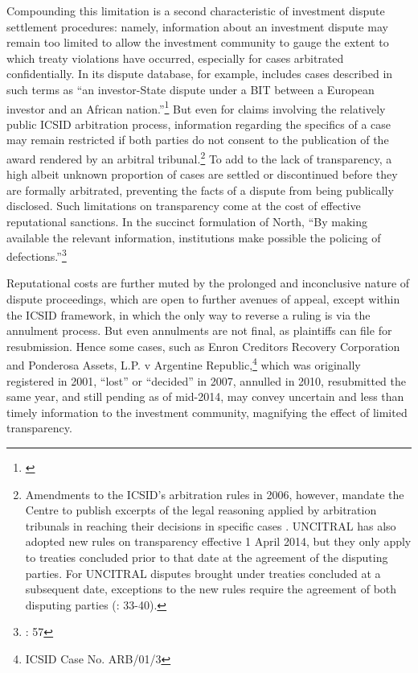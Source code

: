 \documentclass[12pt,onesided]{amsart}
\begin{document}
Compounding this limitation is a second characteristic of investment dispute settlement procedures: namely, information about an investment dispute may remain too limited to allow the investment community to gauge the extent to which treaty violations have occurred, especially for cases arbitrated confidentially. In its dispute database, for example, \citeauthor{unctad:2010} includes cases described in such terms as ``an investor-State dispute under a BIT between a European investor and an African nation.''\footnote{\citet{unctad:2010}} But even for claims involving the relatively public ICSID arbitration process, information regarding the specifics of a case may remain restricted if both parties do not consent to the publication of the award rendered by an arbitral tribunal.\footnote{Amendments to the ICSID's arbitration rules in 2006, however, mandate the Centre to publish excerpts of the legal reasoning applied by arbitration tribunals in reaching their decisions in specific cases \citep{antonietti:2006}. UNCITRAL has also adopted new rules on transparency effective 1 April 2014, but they only apply to treaties concluded prior to that date at the agreement of the disputing parties. For UNCITRAL disputes brought under treaties concluded at a subsequent date, exceptions to the new rules require the agreement of both disputing parties (\citealp{uncitral:2013}: 33-40).}  To add to the lack of transparency, a high albeit unknown proportion of cases are settled or discontinued before they are formally arbitrated, preventing the facts of a dispute from being publically disclosed. Such limitations on transparency come at the cost of effective reputational sanctions. In the succinct formulation of North, ``By making available the relevant information, institutions make possible the policing of defections.''\footnote{\citet{north1990institutions}: 57}

Reputational costs are further muted by the prolonged and inconclusive nature of dispute proceedings, which are open to further avenues of appeal, except within the ICSID framework, in which the only way to reverse a ruling is via the annulment process. But even annulments are not final, as plaintiffs can file for resubmission. Hence some cases, such as Enron Creditors Recovery Corporation and Ponderosa Assets, L.P. v Argentine Republic,\footnote{ICSID Case No. ARB/01/3} which was originally registered in 2001, ``lost'' or ``decided'' in 2007, annulled in 2010, resubmitted the same year, and still pending as of mid-2014, may convey uncertain and less than timely information to the investment community, magnifying the effect of limited transparency. 
\end{document}
